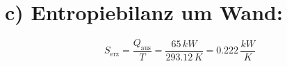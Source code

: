 \section*{c) Entropiebilanz um Wand:}

\[
S_{\text{erz}} = \frac{Q_{\text{aus}}}{T} = \frac{65 \, kW}{293.12 \, K} = 0.222 \, \frac{kW}{K}
\]